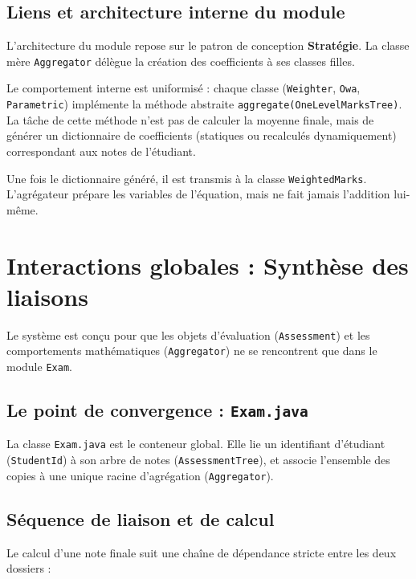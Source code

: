 \documentclass[11pt, a4paper]{article}
\begin{document}
\subsection{Liens et architecture interne du module}

L'architecture du module repose sur le patron de conception \textbf{Stratégie}. La classe mère \texttt{Aggregator} délègue la création des coefficients à ses classes filles. 

Le comportement interne est uniformisé : chaque classe (\texttt{Weighter}, \texttt{Owa}, \texttt{Parametric}) implémente la méthode abstraite \texttt{aggregate(OneLevelMarksTree)}. La tâche de cette méthode n'est pas de calculer la moyenne finale, mais de générer un dictionnaire de coefficients (statiques ou recalculés dynamiquement) correspondant aux notes de l'étudiant. 

Une fois le dictionnaire généré, il est transmis à la classe \texttt{WeightedMarks}. L'agrégateur prépare les variables de l'équation, mais ne fait jamais l'addition lui-même.

\section{Interactions globales : Synthèse des liaisons}

Le système est conçu pour que les objets d'évaluation (\texttt{Assessment}) et les comportements mathématiques (\texttt{Aggregator}) ne se rencontrent que dans le module \texttt{Exam}.

\subsection{Le point de convergence : \texttt{Exam.java}}
La classe \texttt{Exam.java} est le conteneur global. Elle lie un identifiant d'étudiant (\texttt{StudentId}) à son arbre de notes (\texttt{AssessmentTree}), et associe l'ensemble des copies à une unique racine d'agrégation (\texttt{Aggregator}).

\subsection{Séquence de liaison et de calcul}
Le calcul d'une note finale suit une chaîne de dépendance stricte entre les deux dossiers :
\end{document}
